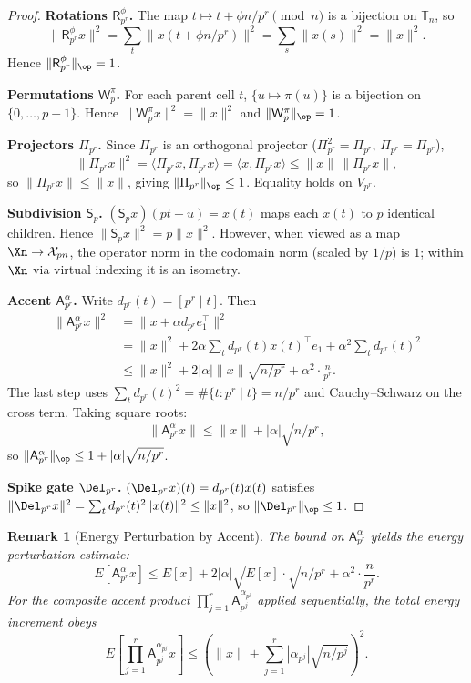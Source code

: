 \documentclass[11pt]{amsart}
\newtheorem{remark}[theorem]{Remark}
\newcommand{\Prj}{\Pi}
\newcommand{\Sp}{\mathsf{S}}
\newcommand{\Ap}{\mathsf{A}}
\newcommand{\Rp}{\mathsf{R}}
\newcommand{\Wp}{\mathsf{W}}
\newcommand{\Tn}{\mathbb{T}_n}
\newcommand{\norm}[1]{\lVert #1 \rVert}
\begin{document}
\begin{proof}
\textbf{Rotations $\Rp_{p^r}^\phi$.} The map $t \mapsto t + \phi n/p^r \pmod{n}$ is a bijection on $\Tn$, so
\[
  \norm{\Rp_{p^r}^\phi x}^2 = \sum_t \norm{x(t + \phi n/p^r)}^2 = \sum_s \norm{x(s)}^2 = \norm{x}^2.
\]
Hence $\norm{\Rp_{p^r}^\phi}_\op = 1$.

\textbf{Permutations $\Wp^\pi_p$.} For each parent cell $t$, $\{u \mapsto \pi(u)\}$ is a bijection on $\{0,\ldots,p-1\}$. Hence $\norm{\Wp^\pi_p x}^2 = \norm{x}^2$ and $\norm{\Wp^\pi_p}_\op = 1$.

\textbf{Projectors $\Prj_{p^r}$.} Since $\Prj_{p^r}$ is an orthogonal projector ($\Prj_{p^r}^2 = \Prj_{p^r}$, $\Prj_{p^r}^\top = \Prj_{p^r}$),
\[
  \norm{\Prj_{p^r} x}^2 = \langle \Prj_{p^r} x, \Prj_{p^r} x\rangle = \langle x, \Prj_{p^r} x\rangle \leq \norm{x}\,\norm{\Prj_{p^r} x},
\]
so $\norm{\Prj_{p^r} x} \leq \norm{x}$, giving $\norm{\Prj_{p^r}}_\op \leq 1$. Equality holds on $V_{p^r}$.

\textbf{Subdivision $\Sp_p$.} $(\Sp_p x)(pt + u) = x(t)$ maps each $x(t)$ to $p$ identical children. Hence $\norm{\Sp_p x}^2 = p \norm{x}^2$. However, when viewed as a map $\Xn \to \mathcal{X}_{pn}$, the operator norm in the codomain norm (scaled by $1/p$) is $1$; within $\Xn$ via virtual indexing it is an isometry.

\textbf{Accent $\Ap^\alpha_{p^r}$.} Write $d_{p^r}(t) = [p^r \mid t]$. Then
\begin{align*}
  \norm{\Ap^\alpha_{p^r} x}^2 &= \norm{x + \alpha d_{p^r} e_1^\top}^2 \\
  &= \norm{x}^2 + 2\alpha \sum_t d_{p^r}(t) x(t)^\top e_1 + \alpha^2 \sum_t d_{p^r}(t)^2 \\
  &\leq \norm{x}^2 + 2|\alpha| \norm{x} \sqrt{n/p^r} + \alpha^2 \cdot \frac{n}{p^r}.
\end{align*}
The last step uses $\sum_t d_{p^r}(t)^2 = \#\{t : p^r \mid t\} = n/p^r$ and Cauchy–Schwarz on the cross term. Taking square roots:
\[
  \norm{\Ap^\alpha_{p^r} x} \leq \norm{x} + |\alpha|\sqrt{n/p^r},
\]
so $\norm{\Ap^\alpha_{p^r}}_\op \leq 1 + |\alpha|\sqrt{n/p^r}$.

\textbf{Spike gate $\Del_{p^r}$.} $(\Del_{p^r} x)(t) = d_{p^r}(t) x(t)$ satisfies $\norm{\Del_{p^r} x}^2 = \sum_t d_{p^r}(t)^2 \norm{x(t)}^2 \leq \norm{x}^2$, so $\norm{\Del_{p^r}}_\op \leq 1$.
\end{proof}

\begin{remark}[Energy Perturbation by Accent]\label{rem:accent-energy}
The bound on $\Ap^\alpha_{p^r}$ yields the energy perturbation estimate:
\[
  E[\Ap^\alpha_{p^r} x] \leq E[x] + 2|\alpha|\sqrt{E[x]} \cdot \sqrt{n/p^r} + \alpha^2 \cdot \frac{n}{p^r}.
\]
For the composite accent product $\prod_{j=1}^r \Ap^{\alpha_{p^j}}_{p^j}$ applied sequentially, the total energy increment obeys
\[
  E\!\left[\prod_{j=1}^r \Ap^{\alpha_{p^j}}_{p^j} x\right] \leq \left(\norm{x} + \sum_{j=1}^r |\alpha_{p^j}| \sqrt{n/p^j}\right)^2.
\]
\end{remark}
\end{document}
